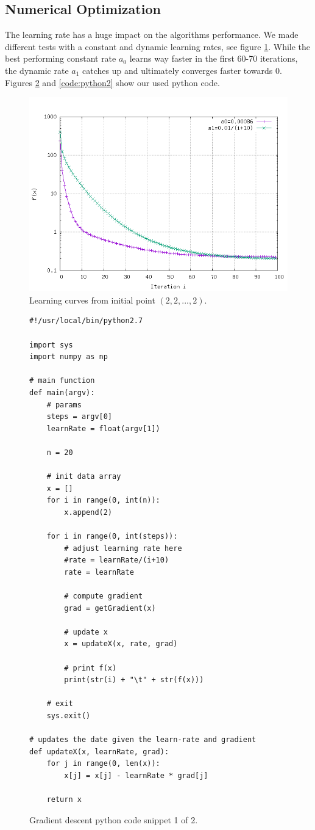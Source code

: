 \documentclass[accentcolor=tud9c]{tudexercise}
\begin{document}
	\subsection{Numerical Optimization}
	The learning rate has a huge impact on the algorithms performance. We made different tests with a constant and dynamic learning rates, see figure \ref{fig:GDA-curve}. While the best performing constant rate $a_0$ learns way faster in the first 60-70 iterations, the dynamic rate $a_1$ catches up and ultimately converges faster towards 0. Figures \ref{code:python1} and \ref{code:python2} show our used python code.
	\begin{figure} [h]
	\centering
	\includegraphics [scale=0.65] {value_logscale.png}
	\caption{Learning curves from initial point $(2,2,...,2)$.}
	\label{fig:GDA-curve}
	\end{figure}
	
	\begin{figure} [h]
	\begin{lstlisting}
#!/usr/local/bin/python2.7

import sys
import numpy as np

# main function
def main(argv):
	# params
	steps = argv[0]
	learnRate = float(argv[1])
	
	n = 20

	# init data array
	x = []
	for i in range(0, int(n)):
		x.append(2)

	for i in range(0, int(steps)):
		# adjust learning rate here
		#rate = learnRate/(i+10)
		rate = learnRate

		# compute gradient
		grad = getGradient(x)

		# update x
		x = updateX(x, rate, grad)
		
		# print f(x)
		print(str(i) + "\t" + str(f(x)))

	# exit
	sys.exit()

# updates the date given the learn-rate and gradient 
def updateX(x, learnRate, grad):
	for j in range(0, len(x)):
		x[j] = x[j] - learnRate * grad[j]

	return x
	\end{lstlisting}
	\caption{Gradient descent python code snippet 1 of 2.}
	\label{code:python1}
	\end{figure}
	
\end{document}
